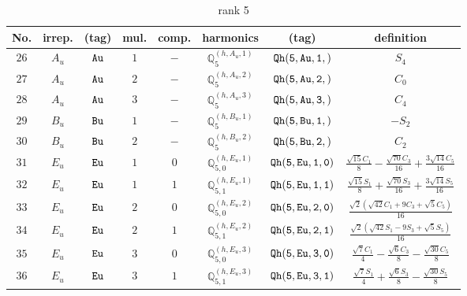 \documentclass[fleqn,8pt]{jsarticle}
\begin{document}
\begin{table}[ht!]
\begin{center}
\caption{rank 5}
\renewcommand{\arraystretch}{1.3}
\begin{tabular}{cccccccc} \hline \hline
No. & irrep. & (tag) & mul. & comp. & harmonics & (tag) & definition \\ \hline
$ 26 $ & $ A_{u} $ & $ {\tt Au} $ & $ 1 $ & $ - $ & $ \mathbb{Q}_{5}^{(h,A_{u},1)} $ & $ {\tt Qh(5,Au,1,)} $ & $ S_{4} $ \\
$ 27 $ & $ A_{u} $ & $ {\tt Au} $ & $ 2 $ & $ - $ & $ \mathbb{Q}_{5}^{(h,A_{u},2)} $ & $ {\tt Qh(5,Au,2,)} $ & $ C_{0} $ \\
$ 28 $ & $ A_{u} $ & $ {\tt Au} $ & $ 3 $ & $ - $ & $ \mathbb{Q}_{5}^{(h,A_{u},3)} $ & $ {\tt Qh(5,Au,3,)} $ & $ C_{4} $ \\
$ 29 $ & $ B_{u} $ & $ {\tt Bu} $ & $ 1 $ & $ - $ & $ \mathbb{Q}_{5}^{(h,B_{u},1)} $ & $ {\tt Qh(5,Bu,1,)} $ & $ - S_{2} $ \\
$ 30 $ & $ B_{u} $ & $ {\tt Bu} $ & $ 2 $ & $ - $ & $ \mathbb{Q}_{5}^{(h,B_{u},2)} $ & $ {\tt Qh(5,Bu,2,)} $ & $ C_{2} $ \\
$ 31 $ & $ E_{u} $ & $ {\tt Eu} $ & $ 1 $ & $ 0 $ & $ \mathbb{Q}_{5,0}^{(h,E_{u},1)} $ & $ {\tt Qh(5,Eu,1,0)} $ & $ \frac{\sqrt{15} C_{1}}{8} - \frac{\sqrt{70} C_{3}}{16} + \frac{3 \sqrt{14} C_{5}}{16} $ \\
$ 32 $ & $ E_{u} $ & $ {\tt Eu} $ & $ 1 $ & $ 1 $ & $ \mathbb{Q}_{5,1}^{(h,E_{u},1)} $ & $ {\tt Qh(5,Eu,1,1)} $ & $ \frac{\sqrt{15} S_{1}}{8} + \frac{\sqrt{70} S_{3}}{16} + \frac{3 \sqrt{14} S_{5}}{16} $ \\
$ 33 $ & $ E_{u} $ & $ {\tt Eu} $ & $ 2 $ & $ 0 $ & $ \mathbb{Q}_{5,0}^{(h,E_{u},2)} $ & $ {\tt Qh(5,Eu,2,0)} $ & $ \frac{\sqrt{2} \left(\sqrt{42} C_{1} + 9 C_{3} + \sqrt{5} C_{5}\right)}{16} $ \\
$ 34 $ & $ E_{u} $ & $ {\tt Eu} $ & $ 2 $ & $ 1 $ & $ \mathbb{Q}_{5,1}^{(h,E_{u},2)} $ & $ {\tt Qh(5,Eu,2,1)} $ & $ \frac{\sqrt{2} \left(\sqrt{42} S_{1} - 9 S_{3} + \sqrt{5} S_{5}\right)}{16} $ \\
$ 35 $ & $ E_{u} $ & $ {\tt Eu} $ & $ 3 $ & $ 0 $ & $ \mathbb{Q}_{5,0}^{(h,E_{u},3)} $ & $ {\tt Qh(5,Eu,3,0)} $ & $ \frac{\sqrt{7} C_{1}}{4} - \frac{\sqrt{6} C_{3}}{8} - \frac{\sqrt{30} C_{5}}{8} $ \\
$ 36 $ & $ E_{u} $ & $ {\tt Eu} $ & $ 3 $ & $ 1 $ & $ \mathbb{Q}_{5,1}^{(h,E_{u},3)} $ & $ {\tt Qh(5,Eu,3,1)} $ & $ \frac{\sqrt{7} S_{1}}{4} + \frac{\sqrt{6} S_{3}}{8} - \frac{\sqrt{30} S_{5}}{8} $ \\
 \hline \hline
\end{tabular}
\end{center}
\end{table}
\end{document}
